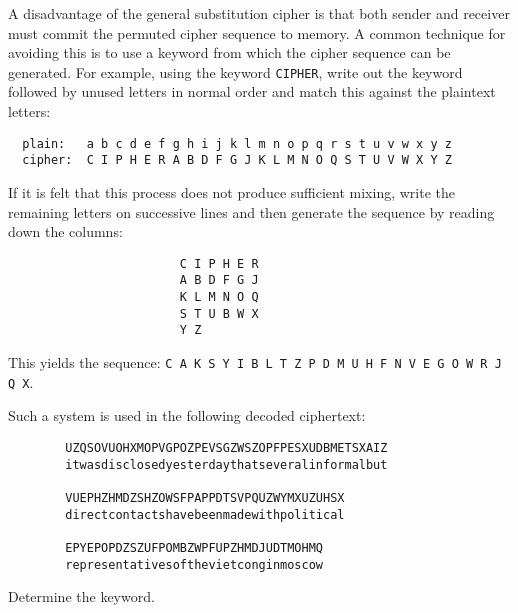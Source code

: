 \begin{problem}
A disadvantage of the general substitution cipher is that both sender and receiver must commit the permuted cipher sequence to memory.  A common technique for avoiding this is to use a keyword from which the cipher sequence can be generated.  For example, using the keyword \texttt{CIPHER}, write out the keyword followed by unused letters in normal order and match this against the plaintext letters:

\begin{verbatim}
  plain:   a b c d e f g h i j k l m n o p q r s t u v w x y z
  cipher:  C I P H E R A B D F G J K L M N O Q S T U V W X Y Z
\end{verbatim}

If it is felt that this process does not produce sufficient mixing, write the remaining letters on successive lines and then generate the sequence by reading down the columns:

\begin{verbatim}
                        C I P H E R
                        A B D F G J
                        K L M N O Q
                        S T U B W X
                        Y Z
\end{verbatim}

This yields the sequence: \verb|C A K S Y I B L T Z P D M U H F N V E G O W R J Q X|.

Such a system is used in the following decoded ciphertext: 

\begin{verbatim}
        UZQSOVUOHXMOPVGPOZPEVSGZWSZOPFPESXUDBMETSXAIZ
        itwasdisclosedyesterdaythatseveralinformalbut

        VUEPHZHMDZSHZOWSFPAPPDTSVPQUZWYMXUZUHSX
        directcontactshavebeenmadewithpolitical

        EPYEPOPDZSZUFPOMBZWPFUPZHMDJUDTMOHMQ
        representativesofthevietconginmoscow
\end{verbatim}

Determine the keyword.

\end{problem}

